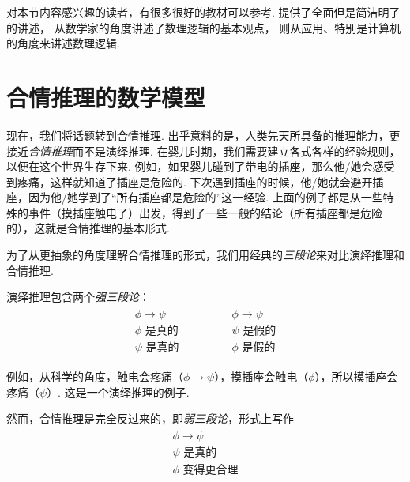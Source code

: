 \begin{remark}
    对本节内容感兴趣的读者，有很多很好的教材可以参考. \cite{vandalenLogicStructure2013} 提供了全面但是简洁明了的讲述，\cite{hamiltonLogicMathematicians1988} 从数学家的角度讲述了数理逻辑的基本观点，\cite{nerodeLogicApplications1997} 则从应用、特别是计算机的角度来讲述数理逻辑. 
\end{remark}

\section{合情推理的数学模型}

现在，我们将话题转到合情推理. 出乎意料的是，人类先天所具备的推理能力，更接近\textit{合情推理}而不是演绎推理. 在婴儿时期，我们需要建立各式各样的经验规则，以便在这个世界生存下来. 例如，如果婴儿碰到了带电的插座，那么他/她会感受到疼痛，这样就知道了插座是危险的. 下次遇到插座的时候，他/她就会避开插座，因为他/她学到了“所有插座都是危险的”这一经验. 上面的例子都是从一些特殊的事件（摸插座触电了）出发，得到了一些一般的结论（所有插座都是危险的），这就是合情推理的基本形式.

为了从更抽象的角度理解合情推理的形式，我们用经典的\textit{三段论}来对比演绎推理和合情推理. 

演绎推理包含两个\textit{强三段论}：
    \[
        \begin{array}{c}
            \begin{array}{c}  
                \phi \to \psi \\ \phi\text{ 是真的} \\ \hline \psi\text{ 是真的}
            \end{array} 
            \qquad \qquad 
            \begin{array}{c}  
                \phi \to \psi \\ \psi\text{ 是假的} \\ \hline \phi\text{ 是假的}
            \end{array}
        \end{array} 
    \]

例如，从科学的角度，触电会疼痛（$\phi\to \psi$），摸插座会触电（$\phi$），所以摸插座会疼痛（$\psi$）. 这是一个演绎推理的例子.

然而，合情推理是完全反过来的，即\textit{弱三段论}，形式上写作 
        \[
        \begin{array}{c}
            \begin{array}{c}  
                \phi \to \psi \\ \psi\text{ 是真的} \\ \hline \phi\text{ 变得更合理}
            \end{array} 
        \end{array} 
    \]

